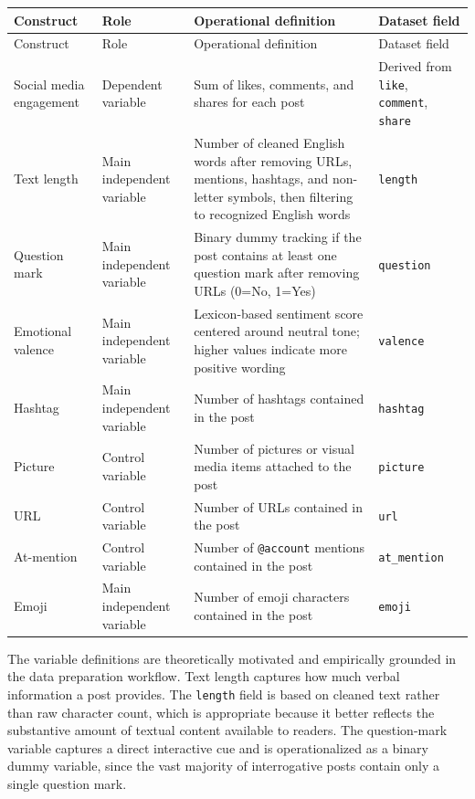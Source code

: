 \documentclass[12pt,a4paper,fontset=none]{ctexart}
\begin{document}
\small
\begin{longtable}{@{}L{0.20\textwidth} L{0.18\textwidth} L{0.36\textwidth} L{0.14\textwidth}@{}}
\toprule
Construct & Role & Operational definition & Dataset field \\
\midrule
\endfirsthead
\toprule
Construct & Role & Operational definition & Dataset field \\
\midrule
\endhead
Social media engagement & Dependent variable & Sum of likes, comments, and shares for each post & Derived from \texttt{like}, \texttt{comment}, \texttt{share} \\
Text length & Main independent variable & Number of cleaned English words after removing URLs, mentions, hashtags, and non-letter symbols, then filtering to recognized English words & \texttt{length} \\
Question mark & Main independent variable & Binary dummy tracking if the post contains at least one question mark after removing URLs (0=No, 1=Yes) & \texttt{question} \\
Emotional valence & Main independent variable & Lexicon-based sentiment score centered around neutral tone; higher values indicate more positive wording & \texttt{valence} \\
Hashtag & Main independent variable & Number of hashtags contained in the post & \texttt{hashtag} \\
Picture & Control variable & Number of pictures or visual media items attached to the post & \texttt{picture} \\
URL & Control variable & Number of URLs contained in the post & \texttt{url} \\
At-mention & Control variable & Number of \texttt{@account} mentions contained in the post & \texttt{at\_mention} \\
Emoji & Main independent variable & Number of emoji characters contained in the post & \texttt{emoji} \\
\bottomrule
\end{longtable}
\normalsize

The variable definitions are theoretically motivated and empirically grounded in the data preparation workflow. Text length captures how much verbal information a post provides. The \texttt{length} field is based on cleaned text rather than raw character count, which is appropriate because it better reflects the substantive amount of textual content available to readers. The question-mark variable captures a direct interactive cue and is operationalized as a binary dummy variable, since the vast majority of interrogative posts contain only a single question mark.
\end{document}
